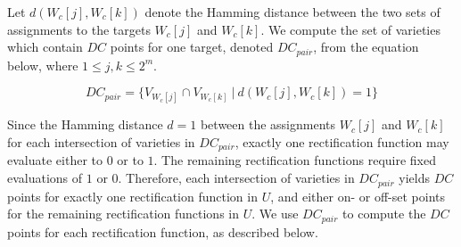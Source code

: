 
Let $d(W_c[j], W_c[k])$ denote the Hamming distance between the two sets of assignments to the targets $W_c[j]$ and $W_c[k]$. We compute the set of varieties which contain $DC$ points for one target, denoted $DC_{pair}$, from the equation below, where $1 \leq j,k \leq 2^m$.

\begin{equation}
  \label{eqn:dc_pair}
  DC_{pair} = \{V_{W_c[j]} \cap V_{W_c[k]}~|~d(W_c[j],W_c[k]) = 1\}
\end{equation}

Since the Hamming distance $d = 1$ between the assignments $W_c[j]$ and $W_c[k]$ for each intersection of varieties in $DC_{pair}$, exactly one rectification function may evaluate either to $0$ or to $1$. The remaining rectification functions require fixed evaluations of $1$ or $0$. Therefore, each intersection of varieties in $DC_{pair}$ yields $DC$ points for exactly one rectification function in $U$, and either on- or off-set points for the remaining rectification functions in $U$. We use $DC_{pair}$ to compute the $DC$ points for each rectification function, as described below. 



